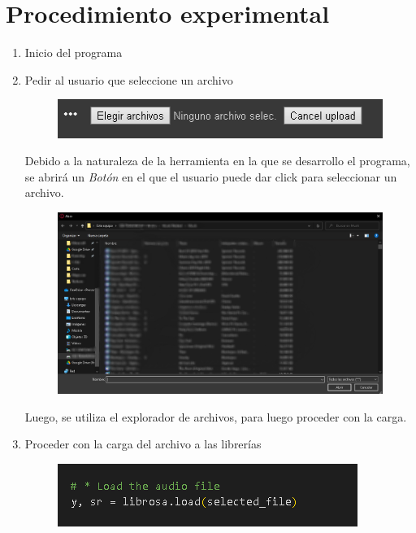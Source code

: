 \documentclass[letterpaper, 12pt]{article}
\begin{document}
\section*{Procedimiento experimental}

\begin{enumerate}
	\item Inicio del programa
	\item Pedir al usuario que seleccione un archivo
	      \begin{figure}[H]
		      \begin{center}
			      \includegraphics[width=.5\linewidth]{./Images/FileUploadColab.PNG}
			      \caption{}
		      \end{center}
	      \end{figure}

	      Debido a la naturaleza de la herramienta en la que se
	      desarrollo el programa, se abrirá un \textit{Botón} en el
	      que el usuario puede dar click para seleccionar un archivo.

	      \begin{figure}[H]
		      \begin{center}
			      \includegraphics[width=.7\linewidth]{./Images/FileExplorer.png}
			      \caption{}
		      \end{center}
	      \end{figure}

	      Luego, se utiliza el explorador de archivos, para luego
	      proceder con la carga.

	\item Proceder con la carga del archivo a las librerías

	      \begin{figure}[H]
		      \begin{center}
			      \includegraphics[width=.5\linewidth]{./Images/LoadFile.PNG}
			      \caption{}
		      \end{center}
	      \end{figure}


\end{enumerate}
\end{document}
